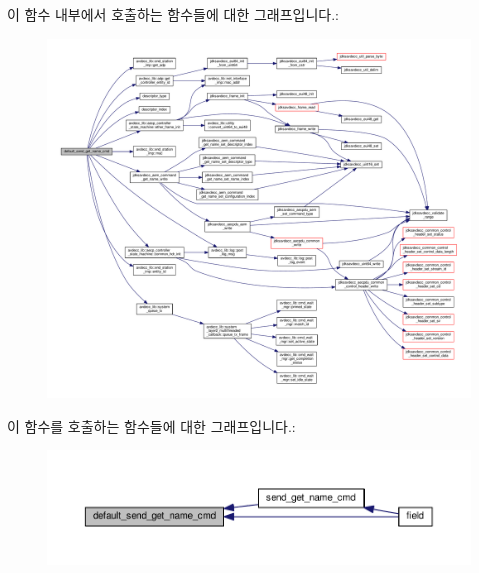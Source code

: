 이 함수 내부에서 호출하는 함수들에 대한 그래프입니다.\+:
\nopagebreak
\begin{figure}[H]
\begin{center}
\leavevmode
\includegraphics[width=350pt]{classavdecc__lib_1_1descriptor__base__imp_a92f2c88d261418872a496a8145800751_cgraph}
\end{center}
\end{figure}




이 함수를 호출하는 함수들에 대한 그래프입니다.\+:
\nopagebreak
\begin{figure}[H]
\begin{center}
\leavevmode
\includegraphics[width=350pt]{classavdecc__lib_1_1descriptor__base__imp_a92f2c88d261418872a496a8145800751_icgraph}
\end{center}
\end{figure}


